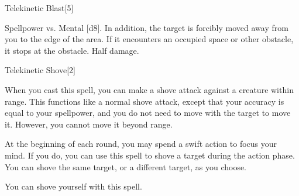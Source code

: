 
\begin{spellsection}{Telekinetic Blast}[5]
    \begin{spellheader}
    \end{spellheader}
    \begin{spellcontent}
        \begin{spelltargetinginfo}
        \end{spelltargetinginfo}
        \begin{spelleffects}
            \begin{spellattack}{Spellpower vs. Mental}
                \spellsuccess {}[d8].
                In addition, the target is forcibly moved away from you to the edge of the area.
                If it encounters an occupied space or other obstacle, it stops at the obstacle.
                \spellfailure Half damage.
            \end{spellattack}
        \end{spelleffects}
    \end{spellcontent}
    \begin{spellfooter}
        \miscastexplode
    \end{spellfooter}
\end{spellsection}


\begin{spellsection}{Telekinetic Shove}[2]
    \begin{spellheader}
    \end{spellheader}
    \begin{spellcontent}
        \begin{spelltargetinginfo}
        \end{spelltargetinginfo}
        \begin{spelleffects}
            \spelleffect When you cast this spell, you can make a shove attack against a creature within \rngclose range.
            This functions like a normal shove attack, except that your accuracy is equal to your spellpower, and you do not need to move with the target to move it.
            However, you cannot move it beyond \rngclose range.

            At the beginning of each round, you may spend a swift action to focus your mind.
            If you do, you can use this spell to shove a target during the action phase.
            You can shove the same target, or a different target, as you choose.
            \spelldur \durshort
        \end{spelleffects}
    \end{spellcontent}
    \begin{spellfooter}
        \spellinfo{Evocation [Telekinesis}{Evocation}
        \spellnotes You can shove yourself with this spell.
        \miscastexplode
    \end{spellfooter}
\end{spellsection}

